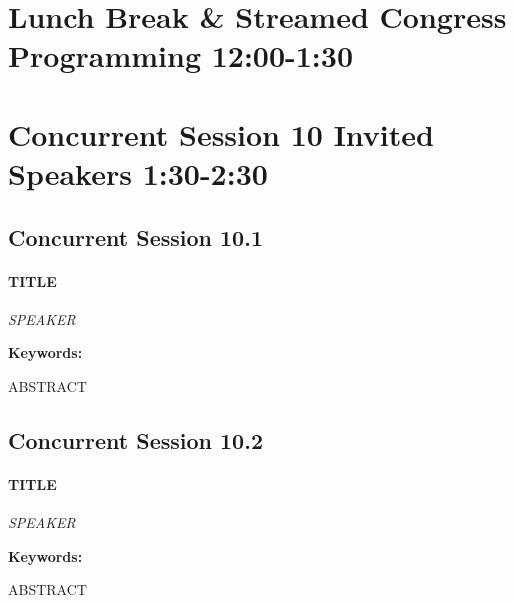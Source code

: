 \documentclass[
]{book}
\begin{document}
\hypertarget{lunch-break-streamed-congress-programming-1200-130}{%
\section*{Lunch Break \& Streamed Congress Programming \textbar{} 12:00-1:30}\label{lunch-break-streamed-congress-programming-1200-130}}

\hypertarget{concurrent-session-10-invited-speakers-130-230}{%
\section*{Concurrent Session 10 \textbar{} Invited Speakers \textbar{} 1:30-2:30}\label{concurrent-session-10-invited-speakers-130-230}}

\hypertarget{concurrent-session-10.1}{%
\subsection*{Concurrent Session 10.1}\label{concurrent-session-10.1}}

\begin{speaker}
\hypertarget{title}{%
\paragraph{\texorpdfstring{\textbf{TITLE}}{TITLE}}\label{title}}

\emph{SPEAKER}

\textbf{Keywords:}

ABSTRACT
\end{speaker}

\hypertarget{concurrent-session-10.2}{%
\subsection*{Concurrent Session 10.2}\label{concurrent-session-10.2}}

\begin{speaker}
\hypertarget{title}{%
\paragraph{\texorpdfstring{\textbf{TITLE}}{TITLE}}\label{title}}

\emph{SPEAKER}

\textbf{Keywords:}

ABSTRACT
\end{speaker}
\end{document}
